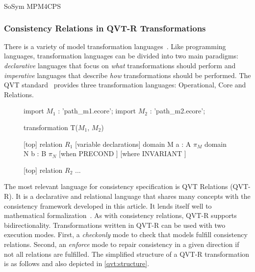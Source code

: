 \begin{copiedFrom}{SoSym MPM4CPS}
\subsubsection{Consistency Relations in QVT-R Transformations}

There is a variety of model transformation languages~\cite{czarnecki2003a}. Like programming languages, transformation languages can be divided into two main paradigms: \textit{declarative} languages that focus on \textit{what} transformations should perform and \textit{imperative} languages that describe \textit{how} transformations should be performed. The QVT standard~\cite{qvt} %
provides three transformation languages: Operational, Core and Relations.

\begin{figure}
\begin{embeddedqvtcode}[frame=bt, numbers=none, mathescape=true, caption={Simplified structure of a QVT-R transformation},label={qvt:structure},captionpos=b]
import $M_1$ : 'path_m1.ecore';
import $M_2$ : 'path_m2.ecore';

transformation T($M_1$, $M_2$) {
    [top] relation $R_1$ {
        [variable declarations]
        domain M a : A { $\pi_{M}$ }
        domain N b : B { $\pi_{N}$ }
        [when { PRECOND }] [where { INVARIANT }]
    }
    
    [top] relation $R_2$ { ... }
}
\end{embeddedqvtcode}
\end{figure}

The most relevant language for consistency specification is QVT Relations (QVT-R). It is a declarative and relational language that shares many concepts with the consistency framework developed in this article. It lends itself well to mathematical formalization~\cite{stevens2010sosym}. As with consistency relations, QVT-R supports bidirectionality. Transformations written in QVT-R can be used with two execution modes. First, a \textit{checkonly} mode to check that models fulfill consistency relations. Second, an \textit{enforce} mode to repair consistency in a given direction if not all relations are fulfilled. The simplified structure of a QVT-R transformation is as follows and also depicted in \autoref{qvt:structure}. 


\end{copiedFrom}
